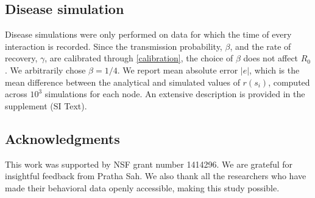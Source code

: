 \documentclass[twocolumn,8pt]{article}
\begin{document}
\subsection{Disease simulation}
\label{simulation}
Disease simulations were only performed on data for which the time of every interaction is recorded. Since the  transmission probability, $\beta$, and the rate of recovery, $\gamma$, are calibrated through \eqref{calibration}, the choice of $\beta$ does not affect $R_{0}$. We arbitrarily chose $\beta=1/4$. We report mean absolute error $|e|$, which is the mean difference between the analytical and simulated values of $r(s_{i})$, computed across $10^3$ simulations for each node. An extensive description is provided in the supplement (SI Text).

\subsection*{Acknowledgments} This work was supported by NSF grant number 1414296. We are grateful for insightful feedback from Pratha Sah. We also thank all the researchers who have made their behavioral data openly accessible, making this study possible.


\qquad

\sffamily
\tiny



\end{document}
